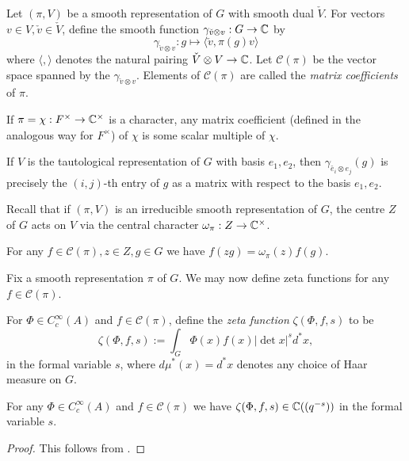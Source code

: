 \begin{defn}
Let $(\pi,V)$ be a smooth representation of $G$ with smooth dual $\check{V}$. For vectors $v\in V, \check{v} \in \check{V}$, define the smooth function $\gamma_{\check{v} \otimes v}: G \to \mathbb{C}$ by 
$$\gamma_{\check{v} \otimes v} : g \mapsto \langle \check{v},\pi(g) v \rangle$$ where $\langle, \rangle$ denotes the natural pairing $\check{V} \otimes V \to \mathbb{C}$. Let $\mathcal C(\pi)$ be the vector space spanned by the $\gamma_{\check{v} \otimes v}$. Elements of $\mathcal C(\pi)$ are called the \textit{matrix coefficients} of $\pi$.
\end{defn}
\begin{rem}
    If $\pi=\chi:F^\times \to \mathbb{C}^\times$ is a character, any matrix coefficient (defined in the analogous way for $F^\times$) of $\chi$ is some scalar multiple of $\chi$.

    If $V$ is the tautological representation of $G$ with basis $e_1,e_2$, then $\gamma_{\check{e_i} \otimes e_j}(g)$ is precisely the $(i,j)$-th entry of $g$ as a matrix with respect to the basis $e_1,e_2$.
\end{rem}

    Recall that if $(\pi,V)$ is an irreducible smooth representation of $G$, the centre $Z$ of $G$ acts on $V$ via the central character $\omega_\pi : Z \to \mathbb{C}^\times$.

\begin{lemma}\label{central char}
    For any $f \in \mathcal C(\pi), z \in Z, g \in G$ we have $f(zg) = \omega_\pi(z) f(g)$.
\end{lemma}


Fix a smooth representation $\pi$ of $G$. We may now define zeta functions for any $f \in \mathcal C(\pi)$.

\begin{defn}
    For $\Phi \in C_c^\infty(A)$ and $f \in \mathcal C(\pi)$, define the \textit{zeta function} $\zeta(\Phi,f,s)$ to be
    $$\zeta(\Phi,f,s) := \int_{G} \Phi(x)f(x)|\det x|^s d^*x,$$ in the formal variable $s$, where $d\mu^*(x) = d^*x$ denotes any choice of Haar measure on $G$.
\end{defn}

\begin{lemma}
    For any $\Phi \in C_c^\infty(A)$ and $f \in \mathcal C(\pi)$ we have $\zeta(\Phi,f,s) \in \mathbb{C}((q^{-s}))$ in the formal variable $s$.
\end{lemma}
\begin{proof}
    This follows from \cite[Lemma 24.4.1]{BH1}.
\end{proof}

